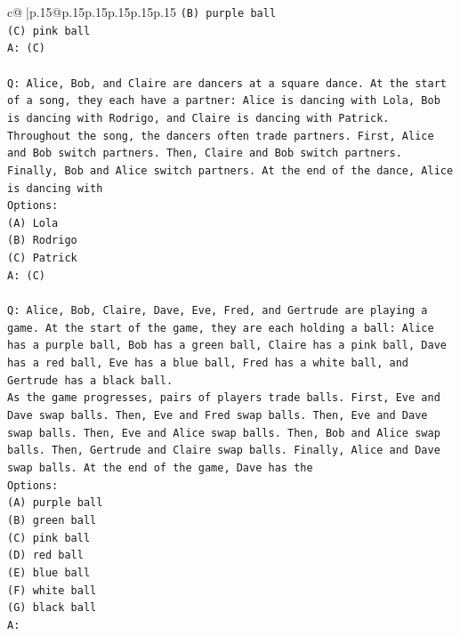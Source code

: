 \documentclass{article}
\begin{document}
{\begin{supertabular}{c@{$\;$}|p{.15\linewidth}@{}p{.15\linewidth}p{.15\linewidth}p{.15\linewidth}p{.15\linewidth}p{.15\linewidth}}
{{{\texttt{(B) purple ball} \\
\texttt{(C) pink ball} \\
\texttt{A: (C)} \\
\\ 
\texttt{Q: Alice, Bob, and Claire are dancers at a square dance. At the start of a song, they each have a partner: Alice is dancing with Lola, Bob is dancing with Rodrigo, and Claire is dancing with Patrick.} \\
\texttt{Throughout the song, the dancers often trade partners. First, Alice and Bob switch partners. Then, Claire and Bob switch partners. Finally, Bob and Alice switch partners. At the end of the dance, Alice is dancing with} \\
\texttt{Options:} \\
\texttt{(A) Lola} \\
\texttt{(B) Rodrigo} \\
\texttt{(C) Patrick} \\
\texttt{A: (C)} \\
\\ 
\texttt{Q: Alice, Bob, Claire, Dave, Eve, Fred, and Gertrude are playing a game. At the start of the game, they are each holding a ball: Alice has a purple ball, Bob has a green ball, Claire has a pink ball, Dave has a red ball, Eve has a blue ball, Fred has a white ball, and Gertrude has a black ball.} \\
\texttt{As the game progresses, pairs of players trade balls. First, Eve and Dave swap balls. Then, Eve and Fred swap balls. Then, Eve and Dave swap balls. Then, Eve and Alice swap balls. Then, Bob and Alice swap balls. Then, Gertrude and Claire swap balls. Finally, Alice and Dave swap balls. At the end of the game, Dave has the} \\
\texttt{Options:} \\
\texttt{(A) purple ball} \\
\texttt{(B) green ball} \\
\texttt{(C) pink ball} \\
\texttt{(D) red ball} \\
\texttt{(E) blue ball} \\
\texttt{(F) white ball} \\
\texttt{(G) black ball} \\
\texttt{A:} \\
            }
        }
    }
     \\ \\


\end{supertabular}}
\end{document}
